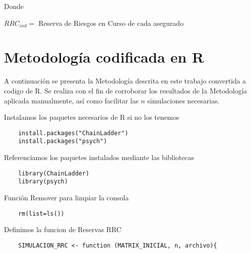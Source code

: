 \documentclass[11pt,twoside,openright,spanish]{report}
\numberwithin{equation}{chapter}
\numberwithin{figure}{chapter}
\numberwithin{table}{chapter}
\begin{document}
$ $

 
	
	Donde
	
	 
	
		
	
	$RRC_{ind}^{}=$ Reserva de Riesgos en Curso de cada asegurado
	


 

\clearpage
\appendix 

\fancyhead[LO]{}
\fancyhead[RE]{}
\pagestyle{fancy}

\chapter{Metodología codificada en R }\label{desarrolloconstadm}

A continuación se presenta la Metodología descrita en este trabajo convertida a codigo de R. Se realiza con el fin de corroborar los resultados de la Metodología aplicada manualmente, así como facilitar las $n$ simulaciones necesarias.


Instalamos los paquetes necesarios de R si no los tenemos
\begin{lstlisting}
	install.packages("ChainLadder")
	install.packages("psych")
\end{lstlisting}

\vspace{0.3cm}
Referenciamos los paquetes instalados mediante las bibliotecas
\begin{lstlisting}	
	library(ChainLadder)
	library(psych)
\end{lstlisting}

\vspace{0.3cm}
Función Remover para limpiar la consola
\begin{lstlisting}		
	rm(list=ls())
\end{lstlisting}

\vspace{0.3cm}
Definimos la funcion de Reservas RRC
\begin{lstlisting}		
	SIMULACION_RRC <- function (MATRIX_INICIAL, n, archivo){
\end{lstlisting}
\end{document}
